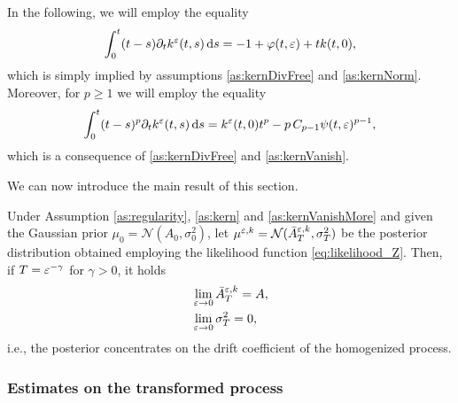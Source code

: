 \documentclass[10pt]{article}
\begin{document}
\begin{remark}\label{rem:kernDeriv} In the following, we will employ the equality
	\begin{equation}\label{eq:kernDiffEquality}
		\int_0^t (t-s) \partial_t k^\varepsilon(t, s) \,\mathrm{d} s = - 1 + \varphi(t, \varepsilon) + t k(t, 0),
	\end{equation}
	which is simply implied by assumptions \ref{as:kernDivFree} and \ref{as:kernNorm}. Moreover, for $p \geq 1$ we will employ the equality
	\begin{equation}
		\int_0^t (t-s)^p \partial_t k^\varepsilon(t, s) \,\mathrm{d} s = k^{\varepsilon}(t, 0)t^p - p \,C_{p-1} \psi(t, \varepsilon)^{p-1},
	\end{equation}
	which is a consequence of \ref{as:kernDivFree} and \ref{as:kernVanish}.
\end{remark}

We can now introduce the main result of this section.

\begin{theorem}\label{thm:mainResultN1} Under Assumption \ref{as:regularity}, \ref{as:kern} and \ref{as:kernVanishMore} and given the Gaussian prior $\mu_0 = \mathcal N(A_0, \sigma_0^2)$, let $\mu^{\varepsilon,k} = \mathcal N(\bar A^{\varepsilon,k}_T, \sigma^2_T)$ be the posterior distribution obtained employing the likelihood function \eqref{eq:likelihood_Z}. Then, if $T = \varepsilon^{-\gamma}$ for $\gamma > 0$, it holds
	\begin{equation}
	\begin{aligned}
		&\lim_{\varepsilon \to 0} \bar A^{\varepsilon,k}_T = A, \\
		&\lim_{\varepsilon \to 0} \sigma^2_T = 0,
	\end{aligned}
	\end{equation}
	i.e., the posterior concentrates on the drift coefficient of the homogenized process. 
\end{theorem}

\subsubsection{Estimates on the transformed process}
\end{document}
